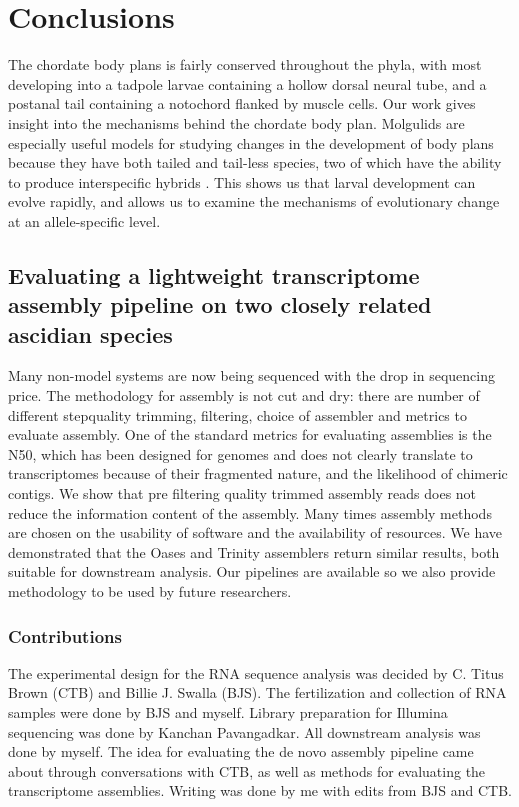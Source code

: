 \chapter{Conclusions}
The chordate body plans is fairly conserved throughout the phyla, with most developing into a tadpole larvae containing a hollow dorsal neural tube, and a postanal tail containing a notochord flanked by muscle cells. Our work gives insight into the mechanisms behind the chordate body plan. Molgulids are especially useful models for studying changes in the development of body plans because they have both tailed and tail-less species, two of which have the ability to produce interspecific hybrids \cite{swalla_interspecific_1990}. This shows us that larval development can evolve rapidly, and allows us to examine the mechanisms of evolutionary change at an allele-specific level.

\section{Evaluating a lightweight transcriptome assembly pipeline on two closely related ascidian species}
Many non-model systems are now being sequenced with the drop in sequencing price. The methodology for assembly is not cut and dry: there are number of different step\textemdash quality trimming, filtering, choice of assembler and metrics to evaluate assembly. One of the standard metrics for evaluating assemblies is the N50, which has been designed for genomes and does not clearly translate to transcriptomes because of their fragmented nature, and the likelihood of chimeric contigs. We show that pre filtering quality trimmed assembly reads does not reduce the information content of the assembly. Many times assembly methods are chosen on the usability of software and the availability of resources. We have demonstrated that the Oases and Trinity assemblers return similar results, both suitable for downstream analysis. Our pipelines are available so we also provide methodology to be used by future researchers. 

\subsection{Contributions}
The experimental design for the RNA sequence analysis was decided by C. Titus Brown (CTB) and Billie J. Swalla (BJS). The fertilization and collection of RNA samples were done by BJS and myself. Library preparation for Illumina sequencing was done by Kanchan Pavangadkar. All downstream analysis was done by myself. The idea for evaluating the de novo assembly pipeline came about through conversations with CTB, as well as methods for evaluating the transcriptome assemblies. Writing was done by me with edits from BJS and CTB.

